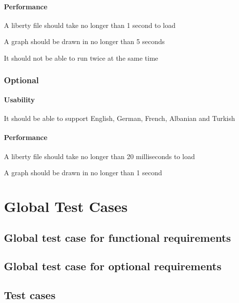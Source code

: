 \documentclass[10pt,a4paper]{report}
\begin{document}
\subsubsection{Performance}
\begin{NFR-Perf}
    \item A liberty file should take no longer than 1 second to load
    \item A graph should be drawn in no longer than 5 seconds
    \item It should not be able to run twice at the same time
\end{NFR-Perf}

\subsection{Optional}
\subsubsection{Usability}
\begin{NFRO-Usability}
    \item It should be able to support English, German, French, Albanian and Turkish
\end{NFRO-Usability}

\subsubsection{Performance}
\begin{NFRO-Perf}
    \item A liberty file should take no longer than 20 milliseconds to load
    \item A graph should be drawn in no longer than 1 second
\end{NFRO-Perf}

\chapter{Global Test Cases}
\section{Global test case for functional requirements}
\section{Global test case for optional requirements}
\section{Test cases}
\end{document}
